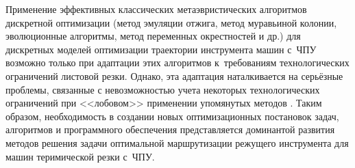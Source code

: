 Применение эффективных классических метаэвристических
алгоритмов дискретной оптимизации
(метод эмуляции отжига,
метод муравьиной колонии,
эволюционные алгоритмы,
метод переменных окрестностей и др.)
для дискретных моделей оптимизации траектории инструмента машин с~ЧПУ
возможно только при адаптации этих алгоритмов к~требованиям
технологических ограничений листовой резки.
Однако, эта адаптация наталкивается на серьёзные проблемы,
связанные с невозможностью учета некоторых технологических ограничений при
<<лобовом>> применении упомянутых методов
\cite{bi:panteleev2009,bi:Reihaneh2012,bi:Karapetyan2011,bi:gendreau2010handbook,bi:Ghilas2016Aug,bi:Helsgaun2015Sep}.
Таким образом,
необходимость в создании новых оптимизационных постановок задач,
алгоритмов и программного обеспечения представляется
доминантой развития методов решения
задачи оптимальной маршрутизации
режущего инструмента для
машин теримической резки с~ЧПУ.
